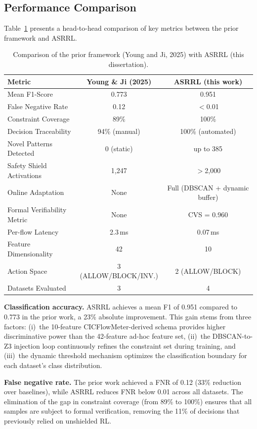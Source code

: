 \documentclass[12pt, letterpaper, oneside]{report}
\newcommand{\ASRRL}{\textsc{ASRRL}}
\begin{document}
\subsection{Performance Comparison}

Table~\ref{tab:prior_vs_asrrl} presents a head-to-head comparison of key metrics between the prior framework and \ASRRL{}.

\begin{table}[htbp]
\centering
\caption{Comparison of the prior framework (Young and Ji, 2025) with \ASRRL{} (this dissertation).}
\label{tab:prior_vs_asrrl}
\small
\begin{tabular}{lcc}
\toprule
\textbf{Metric} & \textbf{Young \& Ji (2025)} & \textbf{ASRRL (this work)} \\
\midrule
Mean F1-Score & 0.773 & 0.951 \\
False Negative Rate & 0.12 & $<$0.01 \\
Constraint Coverage & 89\% & 100\% \\
Decision Traceability & 94\% (manual) & 100\% (automated) \\
Novel Patterns Detected & 0 (static) & up to 385 \\
Safety Shield Activations & 1,247 & $>$2,000 \\
Online Adaptation & None & Full (DBSCAN + dynamic buffer) \\
Formal Verifiability Metric & None & CVS = 0.960 \\
Per-flow Latency & 2.3\,ms & 0.07\,ms \\
Feature Dimensionality & 42 & 10 \\
Action Space & 3 (ALLOW/BLOCK/INV.) & 2 (ALLOW/BLOCK) \\
Datasets Evaluated & 3 & 4 \\
\bottomrule
\end{tabular}
\end{table}

\textbf{Classification accuracy.} \ASRRL{} achieves a mean F1 of 0.951 compared to 0.773 in the prior work, a 23\% absolute improvement. This gain stems from three factors: (i)~the 10-feature CICFlowMeter-derived schema provides higher discriminative power than the 42-feature ad-hoc feature set, (ii)~the DBSCAN-to-Z3 injection loop continuously refines the constraint set during training, and (iii)~the dynamic threshold mechanism optimizes the classification boundary for each dataset's class distribution.

\textbf{False negative rate.} The prior work achieved a FNR of 0.12 (33\% reduction over baselines), while \ASRRL{} reduces FNR below 0.01 across all datasets. The elimination of the gap in constraint coverage (from 89\% to 100\%) ensures that all samples are subject to formal verification, removing the 11\% of decisions that previously relied on unshielded RL.
\end{document}
